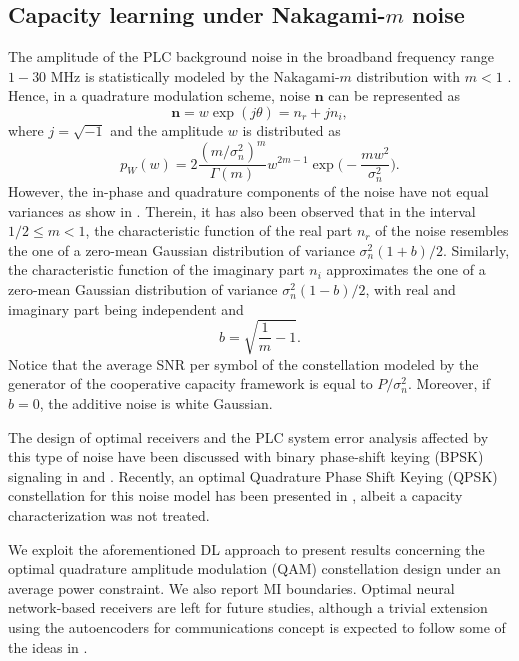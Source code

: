 \subsection{Capacity learning under Nakagami-$m$ noise}
\label{subsec:plc_capacity_nakagami}
The amplitude of the PLC background noise in the broadband frequency range $1-30$ MHz is statistically modeled by the Nakagami-$m$ distribution with $m<1$ \cite{Meng2005}. Hence, in a quadrature modulation scheme, noise $\mathbf{n}$ can be represented as
\begin{equation}
\mathbf{n} = w \exp(j\theta) = n_r + jn_i,
\end{equation}
where $j=\sqrt{-1}$ and the amplitude $w$ is distributed as
\begin{equation}
p_W(w) = 2\frac{(m/\sigma_n^2)^m}{\Gamma(m)}w^{2m-1}\exp\biggl(-\frac{m w^2}{\sigma_n^2}\biggr).
\end{equation}
However, the in-phase and quadrature components of the noise have not equal variances as show in \cite{Mallik2010}. Therein, it has also been observed that in the interval $1/2\leq m <1$, the characteristic function of the real part $n_r$ of the noise resembles the one of a zero-mean Gaussian distribution of variance $\sigma_n^2(1+b)/2$. Similarly, the characteristic function of the imaginary part $n_i$ approximates the one of a zero-mean Gaussian distribution of variance $\sigma_n^2(1-b)/2$, with real and imaginary part being independent and
\begin{equation}
b = \sqrt{\frac{1}{m} -1}.
\end{equation}
Notice that the average SNR per symbol of the constellation modeled by the generator of the cooperative capacity framework is equal to $P/\sigma_n^2$. Moreover, if $b=0$, the additive noise is white Gaussian.

The design of optimal receivers and the PLC system error analysis affected by this type of noise have been discussed with binary phase-shift keying (BPSK) signaling in \cite{Dash2016} and \cite{Mathur2014}. Recently, an optimal Quadrature Phase Shift Keying (QPSK) constellation for this noise model has been presented in \cite{Reddy2020}, albeit a capacity characterization was not  treated.

We exploit the aforementioned DL approach to present results concerning the optimal quadrature amplitude modulation (QAM) constellation design under an average power constraint. We also report MI boundaries. Optimal neural network-based receivers are left for future studies, although a trivial extension using the autoencoders for communications concept is expected to follow some of the ideas in \cite{Oshea2017,Letizia2021}. 

